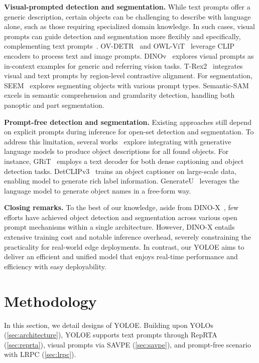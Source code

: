 \documentclass[10pt,twocolumn,letterpaper]{article}
\begin{document}
\textbf{Visual-prompted detection and segmentation.} While text prompts offer a generic description, certain objects can be challenging to describe with language alone, such as those requiring specialized domain knowledge. In such cases, visual prompts can guide detection and segmentation more flexibly and specifically, complementing text prompts~\cite{jiang2023t,jiang2024trex2,kirillov2023sam}. OV-DETR~\cite{zang2022ovdetr} and OWL-ViT~\cite{minderer2022owlvit} leverage CLIP encoders to process text and image prompts. 
DINOv~\cite{li2024dinov} explores visual prompts as in-context examples for generic and referring vision tasks. T-Rex2~\cite{jiang2024trex2} integrates visual and text prompts by region-level contrastive alignment. For segmentation, 
SEEM~\cite{zou2023seem} explores segmenting objects with various prompt types. Semantic-SAM~\cite{li2024semanticsam} excels in semantic comprehension and granularity detection, handling both panoptic and part segmentation.

\textbf{Prompt-free detection and segmentation.} Existing approaches still depend on explicit prompts during inference for open-set detection and segmentation. To address this limitation, several works~\cite{wu2024grit,long2023capdet,yao2024detclipv3,lin2024generateu,ren2024dinox} explore integrating with generative language models to produce object descriptions for all found objects. For instance, GRiT~\cite{wu2024grit} employs a text decoder for both dense captioning and object detection tasks. DetCLIPv3~\cite{yao2024detclipv3} trains an object captioner on large-scale data, enabling model to generate rich label information. GenerateU~\cite{lin2024generateu} leverages the language model to generate object names in a free-form way. 

\textbf{Closing remarks.} To the best of our knowledge, aside from DINO-X~\cite{ren2024dinox}, few efforts have achieved object detection and segmentation across various open prompt mechanisms within a single architecture. However, DINO-X entails extensive training cost and notable inference overhead, severely constraining the practicality for real-world edge deployments. In contrast, our YOLOE aims to deliver an efficient and unified model that enjoys real-time performance and efficiency with easy deployability.

\section{Methodology}
In this section, we detail designs of YOLOE. Building upon YOLOs (\cref{sec:architecture}), YOLOE supports text prompts through RepRTA (\cref{sec:reprta}), visual prompts via SAVPE (\cref{sec:savpe}), and prompt-free scenario with LRPC (\cref{sec:lrpc}).
\end{document}
